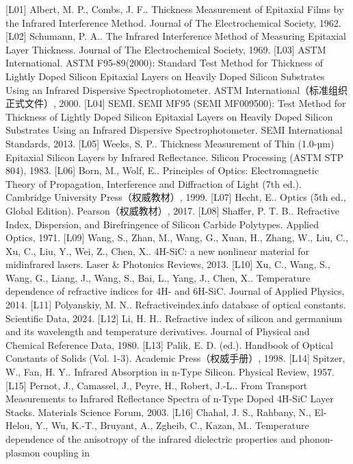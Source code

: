 {[}L01{]} Albert, M. P., Combs, J. F.. Thickness Measurement of
Epitaxial Films by the Infrared Interference Method. Journal of The
Electrochemical Society, 1962. {[}L02{]} Schumann, P. A.. The Infrared
Interference Method of Measuring Epitaxial Layer Thickness. Journal of
The Electrochemical Society, 1969. {[}L03{]} ASTM International. ASTM
F95-89(2000): Standard Test Method for Thickness of Lightly Doped
Silicon Epitaxial Layers on Heavily Doped Silicon Substrates Using an
Infrared Dispersive Spectrophotometer. ASTM
International（标准组织正式文件）, 2000. {[}L04{]} SEMI. SEMI MF95 (SEMI
MF009500): Test Method for Thickness of Lightly Doped Silicon Epitaxial
Layers on Heavily Doped Silicon Substrates Using an Infrared Dispersive
Spectrophotometer. SEMI International Standards, 2013. {[}L05{]} Weeks,
S. P.. Thickness Measurement of Thin (1.0-µm) Epitaxial Silicon Layers
by Infrared Reflectance. Silicon Processing (ASTM STP 804), 1983.
{[}L06{]} Born, M., Wolf, E.. Principles of Optics: Electromagnetic
Theory of Propagation, Interference and Diffraction of Light (7th ed.).
Cambridge University Press（权威教材）, 1999. {[}L07{]} Hecht, E..
Optics (5th ed., Global Edition). Pearson（权威教材）, 2017. {[}L08{]}
Shaffer, P. T. B.. Refractive Index, Dispersion, and Birefringence of
Silicon Carbide Polytypes. Applied Optics, 1971. {[}L09{]} Wang, S.,
Zhan, M., Wang, G., Xuan, H., Zhang, W., Liu, C., Xu, C., Liu, Y., Wei,
Z., Chen, X.. 4H-SiC: a new nonlinear material for midinfrared lasers.
Laser \& Photonics Reviews, 2013. {[}L10{]} Xu, C., Wang, S., Wang, G.,
Liang, J., Wang, S., Bai, L., Yang, J., Chen, X.. Temperature dependence
of refractive indices for 4H- and 6H-SiC. Journal of Applied Physics,
2014. {[}L11{]} Polyanskiy, M. N.. Refractiveindex.info database of
optical constants. Scientific Data, 2024. {[}L12{]} Li, H. H..
Refractive index of silicon and germanium and its wavelength and
temperature derivatives. Journal of Physical and Chemical Reference
Data, 1980. {[}L13{]} Palik, E. D. (ed.). Handbook of Optical Constants
of Solids (Vol. 1-3). Academic Press（权威手册）, 1998. {[}L14{]}
Spitzer, W., Fan, H. Y.. Infrared Absorption in n-Type Silicon. Physical
Review, 1957. {[}L15{]} Pernot, J., Camassel, J., Peyre, H., Robert,
J.-L.. From Transport Measurements to Infrared Reflectance Spectra of
n-Type Doped 4H-SiC Layer Stacks. Materials Science Forum, 2003.
{[}L16{]} Chahal, J. S., Rahbany, N., El-Helou, Y., Wu, K.-T., Bruyant,
A., Zgheib, C., Kazan, M.. Temperature dependence of the anisotropy of
the infrared dielectric properties and phonon-plasmon coupling in
